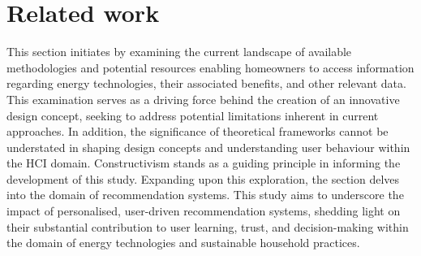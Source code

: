 \chapter{Related work} 





This section initiates by examining the current landscape of available methodologies and potential resources enabling homeowners to access information regarding energy technologies, their associated benefits, and other relevant data. 
This examination serves as a driving force behind the creation of an innovative design concept, seeking to address potential limitations inherent in current approaches.
In addition, the significance of theoretical frameworks cannot be understated in shaping design concepts and understanding user behaviour within the HCI domain. 
Constructivism stands as a guiding principle in informing the development of this study.
Expanding upon this exploration, the section delves into the domain of recommendation systems. 
This study aims to underscore the impact of personalised, user-driven recommendation systems, shedding light on their substantial contribution to user learning, trust, and decision-making within the domain of energy technologies and sustainable household practices.


